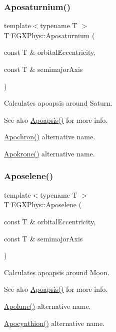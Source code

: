 \subsubsection{\texorpdfstring{Aposaturnium()}{Aposaturnium()}}
{\footnotesize\ttfamily template$<$typename T $>$ \\
T E\+G\+X\+Phys\+::\+Aposaturnium (\begin{DoxyParamCaption}\item[{const T \&}]{orbital\+Eccentricity,  }\item[{const T \&}]{semimajor\+Axis }\end{DoxyParamCaption})}



Calculates apoapsis around Saturn. 

\begin{DoxySeeAlso}{See also}
\mbox{\hyperlink{group___e_g_x_phys-_apoapsis_gaf962e650bf84a568458e8eb39b1c61ba}{Apoapsis()}} for more info. 

\mbox{\hyperlink{group___e_g_x_phys-_apoapsis_gae4ea146039e6f32022321f0998e715e8}{Apochron()}} alternative name. 

\mbox{\hyperlink{group___e_g_x_phys-_apoapsis_ga98557a8d49aa129c29e652c4758334d1}{Apokrone()}} alternative name. 
\end{DoxySeeAlso}
\mbox{\label{group___e_g_x_phys-_apoapsis_gab61f3b2d6a5be3f62f5fb6dfdf802014}} 
\subsubsection{\texorpdfstring{Aposelene()}{Aposelene()}}
{\footnotesize\ttfamily template$<$typename T $>$ \\
T E\+G\+X\+Phys\+::\+Aposelene (\begin{DoxyParamCaption}\item[{const T \&}]{orbital\+Eccentricity,  }\item[{const T \&}]{semimajor\+Axis }\end{DoxyParamCaption})}



Calculates apoapsis around Moon. 

\begin{DoxySeeAlso}{See also}
\mbox{\hyperlink{group___e_g_x_phys-_apoapsis_gaf962e650bf84a568458e8eb39b1c61ba}{Apoapsis()}} for more info. 

\mbox{\hyperlink{group___e_g_x_phys-_apoapsis_gacc68b49812c38394611e1ef3a8bf0e3e}{Apolune()}} alternative name. 

\mbox{\hyperlink{group___e_g_x_phys-_apoapsis_ga557bb4d1a0ce7f17aaa8f8de469d4f52}{Apocynthion()}} alternative name. 
\end{DoxySeeAlso}
\mbox{\label{group___e_g_x_phys-_apoapsis_ga6efaf5c9379f1085fa6e51bf97356124}} 
